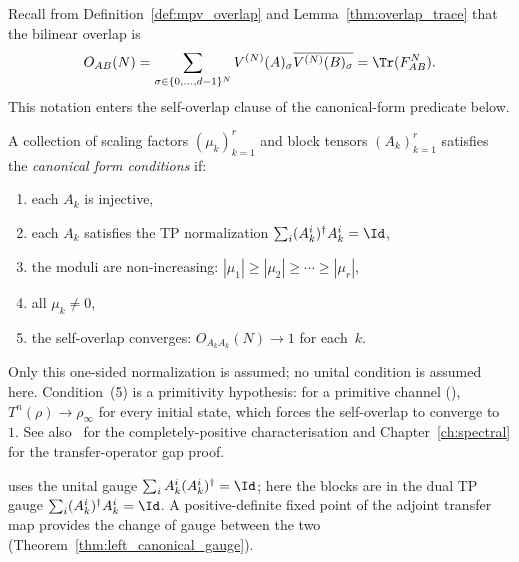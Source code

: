 Recall from Definition~\ref{def:mpv_overlap}
and Lemma~\ref{thm:overlap_trace} that the bilinear overlap is
\[
    O_{AB}(N) = \sum_{\sigma \in \{0,\ldots,d{-}1\}^N}
    V^{(N)}(A)_\sigma \overline{V^{(N)}(B)_\sigma} = \Tr(F_{AB}^N).
\]
This notation enters the self-overlap clause of the canonical-form predicate
below.

\begin{definition}\label{def:is_canonical_form}
    \leanok
    A collection of scaling factors $(\mu_k)_{k=1}^r$ and
    block tensors $(A_k)_{k=1}^r$ satisfies the
    \emph{canonical form conditions} if:
    \begin{enumerate}
        \item each $A_k$ is injective,
        \item each $A_k$ satisfies the TP normalization
              $\sum_i (A_k^i)^\dagger A_k^i = \Id$,
        \item the moduli are non-increasing:
              $|\mu_1| \ge |\mu_2| \ge \cdots \ge |\mu_r|$,
        \item all $\mu_k \neq 0$,
        \item the self-overlap converges: $O_{A_k A_k}(N) \to 1$
              for each~$k$.
    \end{enumerate}
    Only this one-sided normalization is assumed;
    no unital condition is assumed here.
    Condition~(5) is a primitivity hypothesis:
    for a primitive channel
    (\cite[Theorem~6.7(3)]{Wolf2012Quantum}),
    $T^n(\rho) \to \rho_\infty$ for every initial state,
    which forces the self-overlap to converge to~$1$.
    See also~\cite[Theorem~6.8]{Wolf2012Quantum}
    for the completely-positive characterisation
    and Chapter~\ref{ch:spectral} for the transfer-operator gap
    proof.
\end{definition}


\begin{remark}\label{rem:tp_vs_unital}
    \cite[Theorem~4]{PerezGarcia2007Matrix} uses the unital gauge
    $\sum_i A_k^i (A_k^i)^\dagger = \Id$; here the blocks are in the dual TP gauge
    $\sum_i (A_k^i)^\dagger A_k^i = \Id$. A positive-definite fixed point of the
    adjoint transfer map provides the change of gauge between the two
    (Theorem~\ref{thm:left_canonical_gauge}).
\end{remark}

